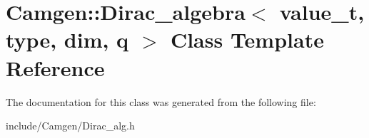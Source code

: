 \hypertarget{a00125}{}\section{Camgen\+:\+:Dirac\+\_\+algebra$<$ value\+\_\+t, type, dim, q $>$ Class Template Reference}
\label{a00125}


The documentation for this class was generated from the following file\+:\begin{DoxyCompactItemize}
\item 
include/\+Camgen/Dirac\+\_\+alg.\+h\end{DoxyCompactItemize}
